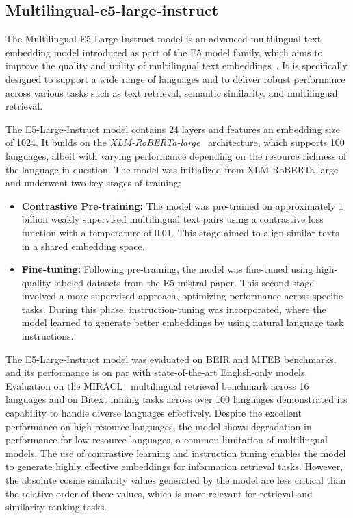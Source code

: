 \subsection{Multilingual-e5-large-instruct}\label{subsec:nextcloud-ai}
The Multilingual E5-Large-Instruct model is an advanced multilingual text embedding model introduced as part of the E5 model family, which aims to improve the quality and utility of multilingual text embeddings~\cite{wang2024multilinguale5textembeddings}.
It is specifically designed to support a wide range of languages and to deliver robust performance across various tasks such as text retrieval, semantic similarity, and multilingual retrieval.

The E5-Large-Instruct model contains 24 layers and features an embedding size of 1024.
It builds on the \textit{XLM-RoBERTa-large}~\cite{DBLP:journals/corr/abs-1911-02116} architecture, which supports 100 languages, albeit with varying performance depending on the resource richness of the language in question.
The model was initialized from XLM-RoBERTa-large and underwent two key stages of training:
\begin{itemize}
    \item \textbf{Contrastive Pre-training:} The model was pre-trained on approximately 1 billion weakly supervised multilingual text pairs using a contrastive loss function with a temperature of 0.01. This stage aimed to align similar texts in a shared embedding space.
    \item \textbf{Fine-tuning:} Following pre-training, the model was fine-tuned using high-quality labeled datasets from the E5-mistral paper. This second stage involved a more supervised approach, optimizing performance across specific tasks. During this phase, instruction-tuning was incorporated, where the model learned to generate better embeddings by using natural language task instructions.
\end{itemize}
The E5-Large-Instruct model was evaluated on BEIR and MTEB benchmarks, and its performance is on par with state-of-the-art English-only models.
Evaluation on the MIRACL~\cite{zhang-etal-2023-miracl} multilingual retrieval benchmark across 16 languages and on Bitext mining tasks across over 100 languages demonstrated its capability to handle diverse languages effectively.
Despite the excellent performance on high-resource languages, the model shows degradation in performance for low-resource languages, a common limitation of multilingual models.
The use of contrastive learning and instruction tuning enables the model to generate highly effective embeddings for information retrieval tasks.
However, the absolute cosine similarity values generated by the model are less critical than the relative order of these values, which is more relevant for retrieval and similarity ranking tasks.


